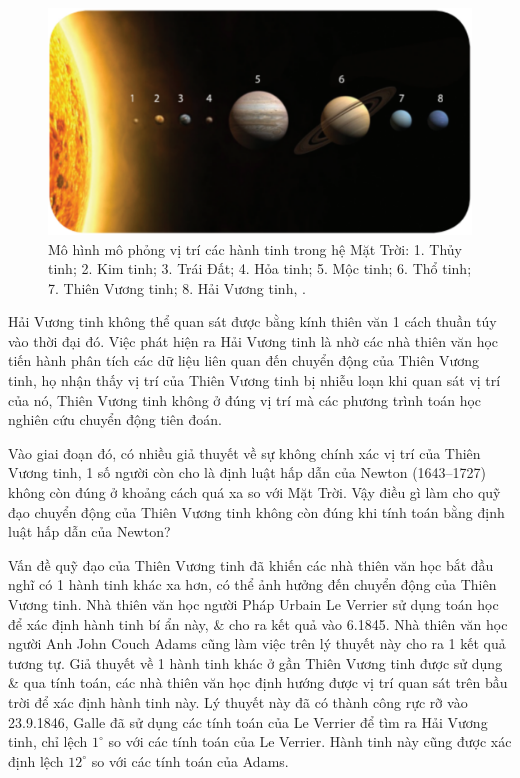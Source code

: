 \documentclass[oneside]{book}
\numberwithin{equation}{section}
\begin{document}
\begin{figure}[H]
	\centering
	\includegraphics[scale=0.2]{cac_hanh_tinh_trong_he_Mat_Troi}
	\caption{Mô hình mô phỏng vị trí các hành tinh trong hệ Mặt Trời: 1. Thủy tinh; 2. Kim tinh; 3. Trái Đất; 4. Hỏa tinh; 5. Mộc tinh; 6. Thổ tinh; 7. Thiên Vương tinh; 8. Hải Vương tinh, \cite[Hình 1.4, p. 7]{SGK_Vat_Ly_10_Chan_Troi_Sang_Tao}.}
	\label{fig:cac hanh tinh trong he Mat Troi}
\end{figure}
Hải Vương tinh không thể quan sát được bằng kính thiên văn 1 cách thuần túy vào thời đại đó. Việc phát hiện ra Hải Vương tinh là nhờ các nhà thiên văn học tiến hành phân tích các dữ liệu liên quan đến chuyển động của Thiên Vương tinh, họ nhận thấy vị trí của Thiên Vương tinh bị nhiễu loạn khi quan sát vị trí của nó, Thiên Vương tinh không ở đúng vị trí mà các phương trình toán học nghiên cứu chuyển động tiên đoán.

Vào giai đoạn đó, có nhiều giả thuyết về sự không chính xác vị trí của Thiên Vương tinh, 1 số người còn cho là định luật hấp dẫn của Newton (1643--1727) không còn đúng ở khoảng cách quá xa so với Mặt Trời. Vậy điều gì làm cho quỹ đạo chuyển động của Thiên Vương tinh không còn đúng khi tính toán bằng định luật hấp dẫn của Newton?

Vấn đề quỹ đạo của Thiên Vương tinh đã khiến các nhà thiên văn học bắt đầu nghĩ có 1 hành tinh khác xa hơn, có thể ảnh hưởng đến chuyển động của Thiên Vương tinh. Nhà thiên văn học người Pháp Urbain Le Verrier sử dụng toán học để xác định hành tinh bí ẩn này, \& cho ra kết quả vào 6.1845. Nhà thiên văn học người Anh John Couch Adams cũng làm việc trên lý thuyết này cho ra 1 kết quả tương tự. Giả thuyết về 1 hành tinh khác ở gần Thiên Vương tinh được sử dụng \& qua tính toán, các nhà thiên văn học định hướng được vị trí quan sát trên bầu trời để xác định hành tinh này. Lý thuyết này đã có thành công rực rỡ vào 23.9.1846, Galle đã sử dụng các tính toán của Le Verrier để tìm ra Hải Vương tinh, chỉ lệch $1^\circ$ so với các tính toán của Le Verrier. Hành tinh này cũng được xác định lệch $12^\circ$ so với các tính toán của Adams.
\end{document}
